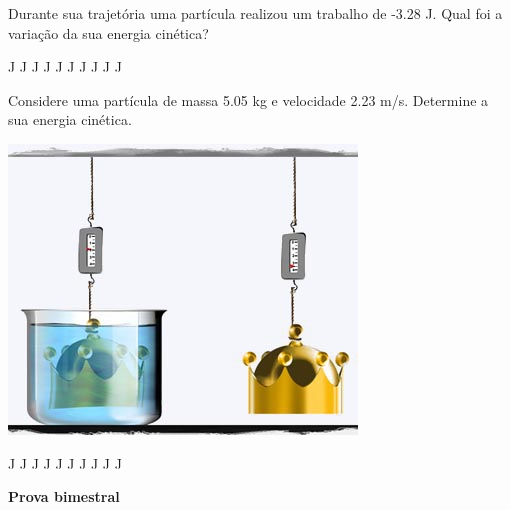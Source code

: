\documentclass[12pt, addpoints]{exam}
\begin{document}
\begin{questions}
\begin{multicols}{2}
\question[33] 
            Durante sua trajetória uma partícula realizou um trabalho de   -3.28 J. Qual foi a variação da sua energia cinética?
        
\begin{oneparchoices}
 J J J J J J J J J J\end{oneparchoices}
\question[23] 
            Considere uma partícula de massa    5.05 kg e velocidade    2.23 m/s. Determine a sua energia cinética.
        
\begin{center}
\begin{minipage}[c]{0.75\linewidth}
\includegraphics[width=\textwidth]{MWE001.jpg}
\end{minipage}
\end{center}
\begin{oneparchoices}
 J J J J J J J J J J\end{oneparchoices}
\end{multicols}
\end{questions}
\newpage
\begin{minipage}[l]{0.5\linewidth}
    \begin{flushleft}
        {\bf \Large Prova bimestral}
    \end{flushleft}
\end{minipage}
\end{document}
